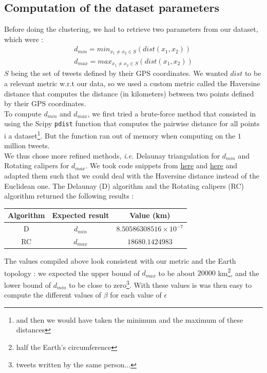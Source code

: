 \documentclass[a4paper,10pt]{article}
\begin{document}
	\subsection{Computation of the dataset parameters}
		Before doing the clustering, we had to retrieve two parameters from our dataset, which were :
		\begin{eqnarray*}
			d_{min} = min_{x_1 \neq x_2 \in S}\left(dist(x_1, x_2)\right) \\
			d_{max} = max_{x_1 \neq x_2 \in S}\left(dist(x_1, x_2)\right)
		\end{eqnarray*}
		$S$ being the set of tweets defined by their GPS coordinates. We wanted $dist$ to be a relevant metric w.r.t our data, so we used a custom metric called the Haversine distance that computes the distance (in kilometers) between two points defined by their GPS coordinates.\\
		To compute $d_{min}$ and $d_{max}$, we first tried a brute-force method that consisted in using the Scipy \texttt{pdist} function that computes the pairwise distance for all points i a dataset\footnote{and then we would have taken the minimum and the maximum of these distances}. But the function ran out of memory when computing on the $1$ million tweets.\\
		We thus chose more refined methods, \textit{i.e.} Delaunay triangulation \cite{Delaunay1934} for $d_{min}$ and Rotating calipers \cite{Shamos1978} for $d_{max}$. We took code snippets from \href{https://stackoverflow.com/questions/5119644/identifying-points-with-the-smallest-euclidean-distance}{here} and \href{https://www.ics.uci.edu/~eppstein/161/python/diameter.py}{here} and adapted them such that we could deal with the Haversine distance instead of the Euclidean one. The Delaunay (D) algorithm and the Rotating calipers (RC) algorithm returned the following results :
		\begin{center}
			\begin{tabular}{| c | c | c |}
				\hline
				Algorithm & Expected result & Value (km)\\ \hline
				D & $d_{min}$ & $8.50586308516 \times 10^{-7}$ \\
				RC & $d_{max}$ & $18680.1424983$ \\
				\hline
			\end{tabular}
		\end{center}
		The values compiled above look consistent with our metric and the Earth topology : we expected the upper bound of $d_{max}$ to be about $20000$ km\footnote{half the Earth's circumference}, and the lower bound of $d_{min}$ to be close to zero\footnote{tweets written by the same person...}. With these values is was then easy to compute the different values of $\beta$ for each value of $\epsilon$
\end{document}
